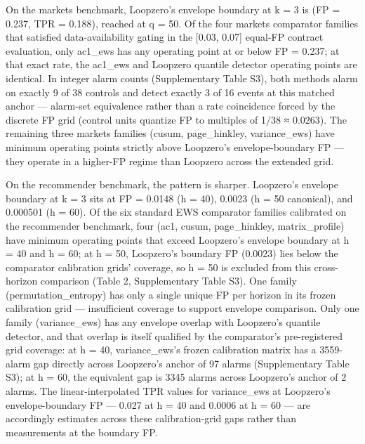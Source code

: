 \documentclass[
  11pt,
]{article}
\begin{document}
On the markets benchmark, Loopzero's envelope boundary at k = 3 is (FP =
0.237, TPR = 0.188), reached at q = 50. Of the four markets comparator
families that satisfied data-availability gating in the {[}0.03, 0.07{]}
equal-FP contract evaluation, only ac1\_ews has any operating point at
or below FP = 0.237; at that exact rate, the ac1\_ews and Loopzero
quantile detector operating points are identical. In integer alarm
counts (Supplementary Table S3), both methods alarm on exactly 9 of 38
controls and detect exactly 3 of 16 events at this matched anchor ---
alarm-set equivalence rather than a rate coincidence forced by the
discrete FP grid (control units quantize FP to multiples of 1/38 ≈
0.0263). The remaining three markets families (cusum, page\_hinkley,
variance\_ews) have minimum operating points strictly above Loopzero's
envelope-boundary FP --- they operate in a higher-FP regime than
Loopzero across the extended grid.

On the recommender benchmark, the pattern is sharper. Loopzero's
envelope boundary at k = 3 sits at FP = 0.0148 (h = 40), 0.0023 (h = 50
canonical), and 0.000501 (h = 60). Of the six standard EWS comparator
families calibrated on the recommender benchmark, four (ac1, cusum,
page\_hinkley, matrix\_profile) have minimum operating points that
exceed Loopzero's envelope boundary at h = 40 and h = 60; at h = 50,
Loopzero's boundary FP (0.0023) lies below the comparator calibration
grids' coverage, so h = 50 is excluded from this cross-horizon
comparison (Table 2, Supplementary Table S3). One family
(permutation\_entropy) has only a single unique FP per horizon in its
frozen calibration grid --- insufficient coverage to support envelope
comparison. Only one family (variance\_ews) has any envelope overlap
with Loopzero's quantile detector, and that overlap is itself qualified
by the comparator's pre-registered grid coverage: at h = 40,
variance\_ews's frozen calibration matrix has a 3559-alarm gap directly
across Loopzero's anchor of 97 alarms (Supplementary Table S3); at h =
60, the equivalent gap is 3345 alarms across Loopzero's anchor of 2
alarms. The linear-interpolated TPR values for variance\_ews at
Loopzero's envelope-boundary FP --- 0.027 at h = 40 and 0.0006 at h = 60
--- are accordingly estimates across these calibration-grid gaps rather
than measurements at the boundary FP.
\end{document}
